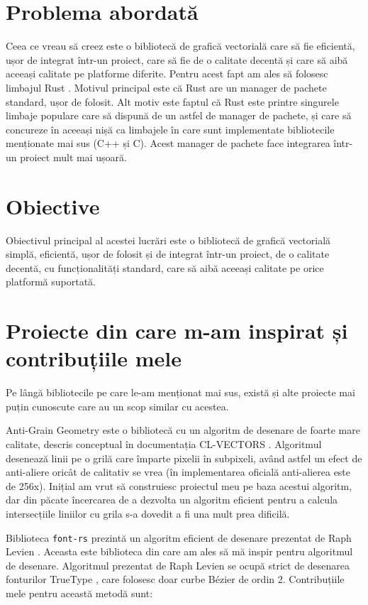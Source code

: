 \documentclass[a4paper, 12pt]{report}
\begin{document}
\section{Problema abordată}

Ceea ce vreau să creez este o bibliotecă de grafică vectorială care să fie eficientă, ușor de integrat într-un proiect,
care să fie de o calitate decentă și care să aibă aceeași calitate pe platforme diferite.
Pentru acest fapt am ales să folosesc limbajul Rust \cite{rust_lang}. Motivul principal este că Rust are un manager
de pachete standard, ușor de folosit. Alt motiv este faptul că Rust este printre singurele limbaje populare care să
dispună de un astfel de manager de pachete, și care să concureze în aceeași nișă ca limbajele în care sunt implementate
bibliotecile menționate mai sus (C++ și C). Acest manager de pachete face integrarea într-un proiect mult mai ușoară.

\section{Obiective}

Obiectivul principal al acestei lucrări este o bibliotecă de grafică vectorială simplă, eficientă, ușor de folosit
și de integrat într-un proiect, de o calitate decentă, cu funcționalități standard, care să aibă aceeași calitate
pe orice platformă suportată.

\section{Proiecte din care m-am inspirat și contribuțiile mele}

Pe lângă bibliotecile pe care le-am menționat mai sus, există și alte proiecte mai puțin cunoscute care au un scop similar
cu acestea.

Anti-Grain Geometry \cite{antigrain_library} este o bibliotecă cu un algoritm de desenare de foarte mare calitate, descris
conceptual în documentația CL-VECTORS \cite{cl-aa_algorithm}. Algoritmul desenează linii pe o grilă care împarte pixelii
în subpixeli, având astfel un efect de anti-aliere oricât de calitativ se vrea (în implementarea oficială anti-alierea este
de 256x). Inițial am vrut să construiesc proiectul meu pe baza acestui algoritm, dar din păcate încercarea de a dezvolta
un algoritm eficient pentru a calcula intersecțiile liniilor cu grila s-a dovedit a fi una mult prea dificilă.

Biblioteca \texttt{font-rs} \cite{font-rs_library} prezintă un algoritm eficient de desenare prezentat de Raph Levien
\cite{fastest_font_renderer_in_the_world}. Aceasta este biblioteca din care am ales să mă inspir pentru algoritmul de
desenare. Algoritmul prezentat de Raph Levien se ocupă strict de desenarea fonturilor TrueType \cite{TrueType}, care
folosesc doar curbe Bézier \cite{bezier_curve} de ordin 2. Contribuțiile mele pentru această metodă sunt:
\end{document}

